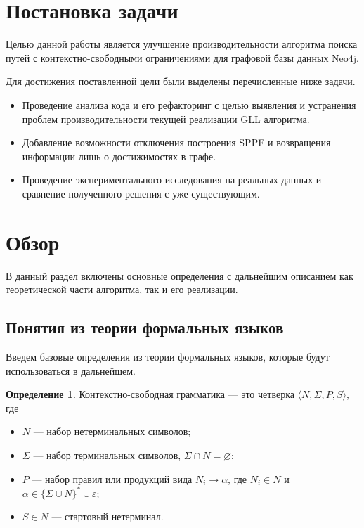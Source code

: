 \documentclass[14pt]{matmex-diploma-custom}
\theoremstyle{definition}
\newtheorem{rudefinition}{Определение}[section]
\begin{document}
\section{Постановка задачи}
Целью данной работы является улучшение производительности алгоритма поиска путей с контекстно-свободными ограничениями для графовой базы данных Neo4j.

Для достижения поставленной цели были выделены перечисленные ниже задачи.
\begin{itemize}
    \item Проведение анализа кода и его рефакторинг с целью выявления и устранения проблем производительности текущей реализации GLL алгоритма.
    \item Добавление возможности отключения построения SPPF и возвращения информации лишь о достижимостях в графе.
    \item Проведение экспериментального исследования на реальных данных и сравнение полученного решения с уже существующим.
\end{itemize}

\section {Обзор}
В данный раздел включены основные определения с дальнейшим описанием как теоретической части алгоритма, так и его реализации.
\subsection{Понятия из теории формальных языков}
Введем базовые определения из теории формальных языков, которые будут использоваться в дальнейшем.
\begin{rudefinition}
     Контекстно-свободная грамматика --- это четверка $\langle N, \Sigma, P, S \rangle $, где
     \begin{itemize}
          \item $N$ --- набор нетерминальных символов;
          \item $ \Sigma $ --- набор терминальных символов, $ \Sigma \cap N = \varnothing $;
          \item $P$ --- набор правил или продукций вида $N_i \rightarrow \alpha$, где $N_i \in N$ и $\alpha \in \{ \Sigma \cup N \}^* \cup \varepsilon $;
          \item $S \in N$ --- стартовый нетерминал.
     \end{itemize}
\end{rudefinition}
\end{document}
